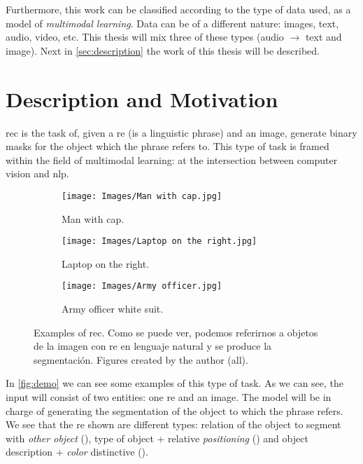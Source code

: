 Furthermore, this work can be classified according to the type of data used, as
a model of \emph{multimodal learning}. Data can be
of a different nature: images, text, audio, video, etc. This thesis will mix
three of these types (audio \(\rightarrow\) text and image). Next in
\vref{sec:description} the work of this thesis will be described.



\section{Description and Motivation}\label{sec:description}

\gls{rec} is the task of, given a \gls{re} (is a linguistic phrase) and an
image, generate binary masks for the object which the phrase refers to. This
type of task is framed within the field of multimodal learning: at the
intersection between computer vision and \gls{nlp}.

\begin{figure}[ht]
  \centering
  \begin{subfigure}[t]{.32\textwidth}
    \centering
    \caption{Man with cap.}
    \texttt{[image: Images/Man with cap.jpg]}
  \end{subfigure}\hfill
  \begin{subfigure}[t]{.32\textwidth}
    \centering
    \caption{Laptop on the right.}
    \texttt{[image: Images/Laptop on the right.jpg]}
  \end{subfigure}\hfill
  \begin{subfigure}[t]{.32\textwidth}
    \centering
    \caption{Army officer white suit.}
    \texttt{[image: Images/Army officer.jpg]}
  \end{subfigure}
  \caption[Examples of ]{Examples of \acl{rec}. Como se puede
    ver, podemos referirnos a objetos de la imagen con \gls{re} en lenguaje
    natural y se produce la segmentación. Figures created by the author
    (all).}\label{fig:demo}
\end{figure}

In \vref{fig:demo} we can see some examples of this type of task. As we can
see, the input will consist of two entities: one \gls{re} and an image. The
model will be in charge of generating the segmentation of the object to which
the phrase refers. We see that the \gls{re} shown are different types: relation
of the object to segment with \emph{other object} (), type
of object + relative \emph{positioning} () and object
description + \emph{color} distinctive ().

